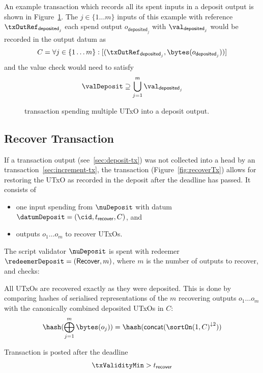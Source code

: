 \noindent An example transaction which records all its spent inputs in a deposit output is
shown in Figure~\ref{fig:depositTx}. The $j \in \{1 \dots m\}$ inputs of this example with reference $\txOutRef_{\mathsf{deposited}_{j}}$ each spend output $o_{\mathsf{deposited}_{j}}$ with $\val_{\mathsf{deposited}_{j}}$ would be recorded in the output datum as
\[
	C = \forall j \in \{1 \dots m\} : [(\txOutRef_{\mathsf{deposited}_{j}},\bytes(o_{\mathsf{deposited}_{j}}))]
\]
\noindent and the value check would need to satisfy
\[
	\valDeposit \supseteq \bigcup_{j=1}^{m} \val_{\mathsf{deposited}_{j}}
\]
\begin{figure}[H]
	\centering
	
	\caption{\mtxDeposit{} transaction spending multiple UTxO into a deposit
		output.}\label{fig:depositTx}
\end{figure}

\subsection{Recover Transaction}\label{sec:recover-tx}

\noindent If a \mtxDeposit{} transaction output (see~\ref{sec:deposit-tx}) was
not collected into a head by an \mtxIncrement{}
transaction~\ref{sec:increment-tx}, the \mtxRecover{} transaction
(Figure~\ref{fig:recoverTx}) allows for restoring the UTxO as recorded in the
deposit after the deadline has passed. It consists of
\begin{itemize}
	\item one input spending from $\nuDeposit$ with datum $\datumDeposit = (\cid, t_{\mathsf{recover}}, C)$, and
	\item outputs $o_{1} \dots o_{m}$ to recover UTxOs.
\end{itemize}

\noindent The script validator $\nuDeposit$ is spent with redeemer
$\redeemerDeposit = (\mathsf{Recover}, m)$, where $m$ is the number of outputs
to recover, and checks:
\begin{menumerate}
	\item All UTxOs are recovered exactly as they were deposited. This is done by
	comparing hashes of serialised representations of the $m$ recovering outputs
	$o_{1} \dots o_{m}$ with the canonically combined deposited UTxOs in $C$:
	\[
		\hash(\bigoplus_{j=1}^{m} \bytes(o_{j})) = \hash(\mathsf{concat}({\sortOn(1, C)}^{\downarrow2}))
	\]
	\item Transaction is posted after the deadline
	\[
		\txValidityMin > t_{\mathsf{recover}}
	\]
\end{menumerate}

